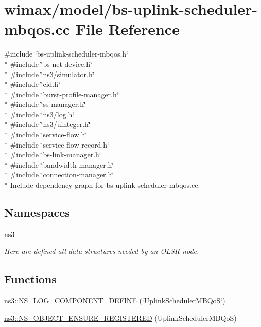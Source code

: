 \hypertarget{bs-uplink-scheduler-mbqos_8cc}{}\section{wimax/model/bs-\/uplink-\/scheduler-\/mbqos.cc File Reference}
\label{bs-uplink-scheduler-mbqos_8cc}
{\ttfamily \#include \char`\"{}bs-\/uplink-\/scheduler-\/mbqos.\+h\char`\"{}}\\*
{\ttfamily \#include \char`\"{}bs-\/net-\/device.\+h\char`\"{}}\\*
{\ttfamily \#include \char`\"{}ns3/simulator.\+h\char`\"{}}\\*
{\ttfamily \#include \char`\"{}cid.\+h\char`\"{}}\\*
{\ttfamily \#include \char`\"{}burst-\/profile-\/manager.\+h\char`\"{}}\\*
{\ttfamily \#include \char`\"{}ss-\/manager.\+h\char`\"{}}\\*
{\ttfamily \#include \char`\"{}ns3/log.\+h\char`\"{}}\\*
{\ttfamily \#include \char`\"{}ns3/uinteger.\+h\char`\"{}}\\*
{\ttfamily \#include \char`\"{}service-\/flow.\+h\char`\"{}}\\*
{\ttfamily \#include \char`\"{}service-\/flow-\/record.\+h\char`\"{}}\\*
{\ttfamily \#include \char`\"{}bs-\/link-\/manager.\+h\char`\"{}}\\*
{\ttfamily \#include \char`\"{}bandwidth-\/manager.\+h\char`\"{}}\\*
{\ttfamily \#include \char`\"{}connection-\/manager.\+h\char`\"{}}\\*
Include dependency graph for bs-\/uplink-\/scheduler-\/mbqos.cc\+:
\subsection*{Namespaces}
\begin{DoxyCompactItemize}
\item 
 \hyperlink{namespacens3}{ns3}
\begin{DoxyCompactList}\small\item\em Here are defined all data structures needed by an O\+L\+SR node. \end{DoxyCompactList}\end{DoxyCompactItemize}
\subsection*{Functions}
\begin{DoxyCompactItemize}
\item 
\hyperlink{namespacens3_a59426061a54a88ddcb0bfb55706c04b8}{ns3\+::\+N\+S\+\_\+\+L\+O\+G\+\_\+\+C\+O\+M\+P\+O\+N\+E\+N\+T\+\_\+\+D\+E\+F\+I\+NE} (\char`\"{}Uplink\+Scheduler\+M\+B\+QoS\char`\"{})
\item 
\hyperlink{namespacens3_a29caba00fefea5675017528ca5e229b7}{ns3\+::\+N\+S\+\_\+\+O\+B\+J\+E\+C\+T\+\_\+\+E\+N\+S\+U\+R\+E\+\_\+\+R\+E\+G\+I\+S\+T\+E\+R\+ED} (Uplink\+Scheduler\+M\+B\+QoS)
\end{DoxyCompactItemize}
